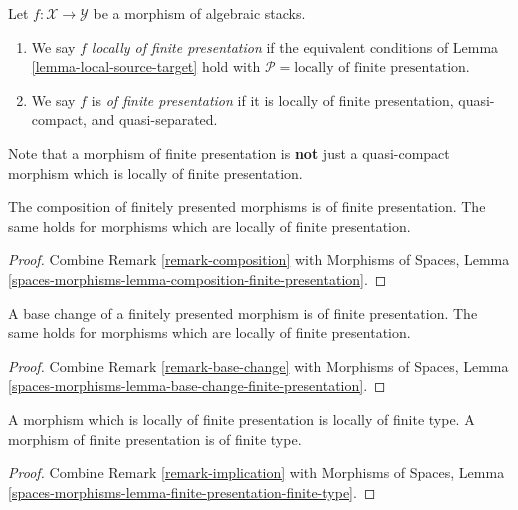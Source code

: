 \begin{definition}
\label{definition-locally-finite-presentation}
Let $f : \mathcal{X} \to \mathcal{Y}$ be a morphism of algebraic stacks.
\begin{enumerate}
\item We say $f$
{\it locally of finite presentation} if the equivalent conditions of
Lemma \ref{lemma-local-source-target}
hold with
$\mathcal{P} = \text{locally of finite presentation}$.
\item We say $f$ is
{\it of finite presentation} if it is locally of finite presentation,
quasi-compact, and quasi-separated.
\end{enumerate}
\end{definition}

\noindent
Note that a morphism of finite presentation is {\bf not} just a quasi-compact
morphism which is locally of finite presentation.

\begin{lemma}
\label{lemma-composition-finite-presentation}
The composition of finitely presented morphisms is of finite presentation.
The same holds for morphisms which are locally of finite presentation.
\end{lemma}

\begin{proof}
Combine
Remark \ref{remark-composition}
with
Morphisms of Spaces, Lemma
\ref{spaces-morphisms-lemma-composition-finite-presentation}.
\end{proof}

\begin{lemma}
\label{lemma-base-change-finite-presentation}
A base change of a finitely presented morphism is of finite presentation.
The same holds for morphisms which are locally of finite presentation.
\end{lemma}

\begin{proof}
Combine
Remark \ref{remark-base-change}
with
Morphisms of Spaces, Lemma
\ref{spaces-morphisms-lemma-base-change-finite-presentation}.
\end{proof}

\begin{lemma}
\label{lemma-finite-presentation-finite-type}
A morphism which is locally of finite presentation is locally of finite type.
A morphism of finite presentation is of finite type.
\end{lemma}

\begin{proof}
Combine
Remark \ref{remark-implication}
with
Morphisms of Spaces, Lemma
\ref{spaces-morphisms-lemma-finite-presentation-finite-type}.
\end{proof}

